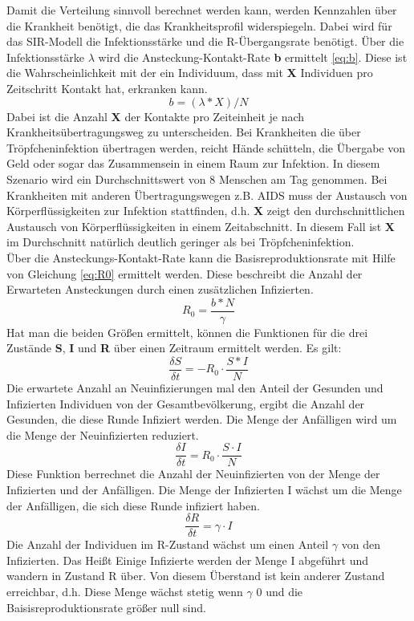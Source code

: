 Damit die Verteilung sinnvoll berechnet werden kann, werden Kennzahlen über die Krankheit benötigt, die das Krankheitsprofil widerspiegeln. Dabei wird für das SIR-Modell die Infektionsstärke und die \grqq R\glqq{}-Übergangsrate benötigt.
Über die Infektionsstärke $\lambda$ wird die Ansteckung-Kontakt-Rate \textbf{b} ermittelt \ref{eq:b}. Diese ist die Wahrscheinlichkeit mit der ein Individuum, dass mit \textbf{X} Individuen pro Zeitschritt Kontakt hat, erkranken kann.
\begin{equation} \label{eq:b}
b = ( \lambda * X ) / N
\end{equation}
Dabei ist die Anzahl \textbf{X} der Kontakte pro Zeiteinheit je nach Krankheitsübertragungsweg zu unterscheiden. Bei Krankheiten die über Tröpfcheninfektion übertragen werden, reicht Hände schütteln, die Übergabe von Geld oder sogar das Zusammensein in einem Raum zur Infektion. In diesem Szenario wird ein Durchschnittswert von 8 Menschen am Tag genommen.
Bei Krankheiten mit anderen Übertragungswegen z.B. AIDS muss der Austausch von Körperflüssigkeiten zur Infektion stattfinden, d.h. \textbf{X} zeigt den durchschnittlichen Austausch von Körperflüssigkeiten in einem Zeitabschnitt. In diesem Fall ist \textbf{X} im Durchschnitt natürlich deutlich geringer als bei Tröpfcheninfektion.\\
Über die Ansteckungs-Kontakt-Rate kann die Basisreproduktionsrate   mit Hilfe von Gleichung \ref{eq:R0} ermittelt werden. Diese beschreibt die Anzahl der Erwarteten Ansteckungen durch einen zusätzlichen Infizierten.
\begin{equation}\label{eq:R0}
R_0 = \frac{ b * N }{ \gamma }
\end{equation}
Hat man die beiden Größen ermittelt, können die Funktionen für die drei Zustände \textbf{S}, \textbf{I} und \textbf{R} über einen Zeitraum ermittelt werden. 
Es gilt:
\begin{equation}
\frac{ \delta S }{ \delta t } = -R_0 \cdot \frac{S * I}{N}
\end{equation}
Die erwartete Anzahl an Neuinfizierungen mal den Anteil der Gesunden und Infizierten Individuen von der Gesamtbevölkerung, ergibt die Anzahl der Gesunden, die diese Runde Infiziert werden. Die Menge der Anfälligen wird um die Menge der Neuinfizierten reduziert.
\begin{equation}
\frac{\delta I }{\delta t} = R_0 \cdot \frac{S \cdot I}{N}
\end{equation}
Diese Funktion berrechnet die Anzahl der Neuinfizierten von der Menge der Infizierten und der Anfälligen. Die Menge der Infizierten I wächst um die Menge der Anfälligen, die sich diese Runde infiziert haben.
\begin{equation}
\frac{\delta R }{\delta t} = \gamma \cdot I
\end{equation}
Die Anzahl der Individuen im R-Zustand wächst um einen Anteil $\gamma$ von den Infizierten. Das Heißt Einige Infizierte werden der Menge I abgeführt und wandern in Zustand R über. Von diesem Überstand ist kein anderer Zustand erreichbar, d.h. Diese Menge wächst stetig wenn $\gamma$ 0 und die Baisisreproduktionsrate größer null sind.

